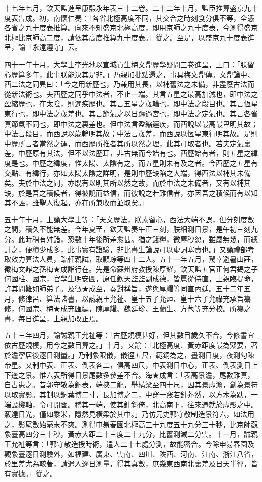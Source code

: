 \begin{pinyinscope}
十七年七月，欽天監進呈康熙永年表三十二卷。二十二年十月，監臣推算盛京九十度表告成。初，南懷仁奏：「各省北極高度不同，其交合之時刻食分俱不等，全憑各省之九十度表推算。向來不知盛京北極高度，即用京師之九十度表，今測得盛京北極比京師高二度，請依其高度推算九十度表。」從之。至是，以盛京九十度表進呈，諭「永遠遵守」云。

四十一年十月，大學士李光地以宣城貢生梅文鼎歷學疑問三卷進呈，上曰：「朕留心歷算多年，此事朕能決其是非。」乃親加批點還之，事具梅文鼎傳。文鼎論中、西二法之同異曰：「今之用新歷也，乃兼用其長，以補舊法之未備，非盡廢古法而從新法術也。夫西歷之同乎中法者，不止一端。其言五星之最高加減也，即中法之盈縮歷也，在太陰，則遲疾歷也。其言五星之歲輪也，即中法之段目也。其言恆星東行也，即中法之歲差也。其言節氣之以日躔過宮也，即中法之定氣也。其言各省真節氣不同也，即中法之裏差也。但中法言盈縮遲疾，而西說以最高最卑明其故；中法言段目，而西說以歲輪明其故；中法言歲差，而西說以恆星東行明其故。是則中歷所言者當然之運，而西歷所推者其所以然之理，此其可取者也。若夫定氣裏差，中歷原有其法，但不以法歷耳，非古無而今始有也。西歷始有者，則五星之緯度是也。中歷之緯度，惟太陽、太陰有之，而五星則未有及之者。今西歷之五星有交點、有緯行，亦如太陽太陰之詳明，是則中歷缺陷之大端，得西法以補其未備矣。夫於中法之同，亦既有以明其所以然之故，而於中法之未備者，又有以補其缺，於是吾之積候者，得彼說而益信，而彼說之若難信者，亦因吾之積候而有以知其不誣，雖聖人復起，亦在所兼收而並取矣。」

五十年十月，上諭大學士等：「天文歷法，朕素留心，西法大端不誤，但分刻度數之間，積久不能無差。今年夏至，欽天監奏午正三刻，朕細測日景，是午初三刻九分。此時稍有舛錯，恐數十年後所差愈甚。猶之錢糧，微塵秒忽，雖屬無幾，而總計之，便積少成多，此事實有證驗，非比書生論說可以虛詞塞責也。」又諭禮部考取效力算法人員，臨軒親試，取顧琮等四十二人。五十一年五月，駕幸避暑山莊，徵梅文鼎之孫梅★成詣行在。先是命蘇州府教授陳厚耀，欽天監五官正何君錫之子何國柱、國宗，官學生明安圖，原任欽天監監副成德，皆扈從侍直，上親臨提命，許其問難如師弟子。及徵★成至，奏對稱旨，遂與厚耀等同直內廷。五十二年五月，修律呂、算法諸書，以誠親王允祉、皇十五子允烜、皇十六子允祿充承旨纂修，何國宗、梅★成充匯編，陳厚耀、魏廷珍、王蘭生、方苞等充分校。所纂之書，每日進呈，上親加改正焉。

五十三年四月，諭誠親王允祉等：「古歷規模甚好，但其數目歲久不合，今修書宜依古歷規模，用今之數目算之。」十月，又諭：「北極高度、黃赤距度最為緊要，著於澹寧居後逐日測量。」乃制象限儀，儀徑五尺，範銅為之，晝測日度，夜測勾陳帝星。又制中表、正表、倒表各二，俱高四尺，中表測日中心，正表、倒表測日上下邊之景。惟六表所得日景尾數多參差不合。海★成言：「表高景澹，尾數難真，自古患之。昔郭守敬為銅表，端挾二龍，舉橫梁至四十尺，因其景虛澹，創為景符以取實影。其制以銅葉博二寸，長加博之二，中穿一竅若針芥然，以方木為趺，一端設機軸，令可開闔。稽其一端，使其針斜倚，北高南下，往來遷就於虛影之中。竅達日光，僅如黍米，隱然見橫梁於其中。」乃仿元史郭守敬制造景符六，如法用之，影尾數始毫末不爽。測得申昜春園北極高三十九度五十九分三十秒，比京師觀象臺高四分三十秒，黃赤大距二十三度二十九分，比舊測減二分雲。十一月，誠親王允祉等言：「郭守敬造授時術，遣人二十七處分測，故能密合。今除申昜春園及觀象臺逐日測驗外，如福建、廣東、雲南、四川、陜西、河南、江南、浙江八省，於里差尤為較著，請遣人逐日測量，得其真數，庶幾東西南北裏差及日天半徑，皆有實據。」從之。


\end{pinyinscope}
